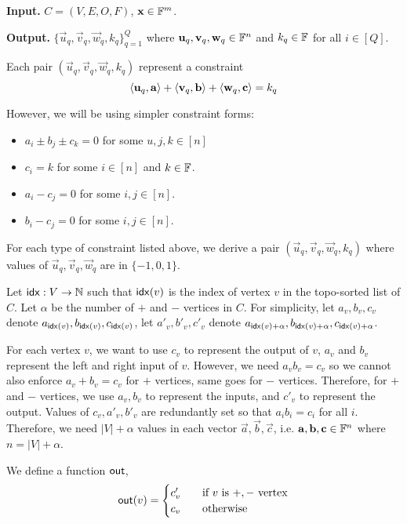 \textbf{Input.} $C = (V, E, O, F)$, $\mathbf{x} \in \mathbb{F}^m$.

\textbf{Output.} $\{ \Vec{u}_q, \Vec{v}_q, \Vec{w}_q, k_q \}_{q=1}^{Q}$ where $\mathbf{u}_q, \mathbf{v}_q, \mathbf{w}_q \in \mathbb{F}^n$ and $k_q \in \mathbb{F}$ for all $i \in [Q]$.

Each pair $(\Vec{u}_q, \Vec{v}_q, \Vec{w}_q, k_q)$ represent a constraint
$$\langle \mathbf{u}_q, \mathbf{a} \rangle + \langle \mathbf{v}_q, \mathbf{b} \rangle + \langle \mathbf{w}_q, \mathbf{c} \rangle = k_q$$

However, we will be using simpler constraint forms:
\begin{itemize}
    \item $a_i \pm b_j \pm c_k = 0$ for some $u, j, k \in [n]$
    \item $c_i = k$ for some $i \in [n]$ and $k \in \mathbb{F}$.
    \item $a_i - c_j = 0$ for some $i, j \in [n]$.
    \item $b_i - c_j = 0$ for some $i, j \in [n]$.
\end{itemize}

For each type of constraint listed above, we derive a pair $(\Vec{u}_q, \Vec{v}_q, \Vec{w}_q, k_q)$ where values of $\Vec{u}_q, \Vec{v}_q, \Vec{w}_q$ are in $\{-1, 0, 1\}$.

Let $\mathsf{idx}: V \to \mathbb{N}$ such that $\mathsf{idx}(v)$ is the index of vertex $v$ in the topo-sorted list of $C$. Let $\alpha$ be the number of $+$ and $-$ vertices in $C$. For simplicity, let $a_v, b_v, c_v$ denote $a_{\mathsf{idx}(v)}, b_{\mathsf{idx}(v)}, c_{\mathsf{idx}(v)}$, let $a'_v, b'_v, c'_v$ denote $a_{\mathsf{idx}(v) + \alpha}, b_{\mathsf{idx}(v) + \alpha}, c_{\mathsf{idx}(v) + \alpha}$.

For each vertex $v$, we want to use $c_v$ to represent the output of $v$, $a_v$ and $b_v$ represent the left and right input of $v$. However, we need $a_v b_v = c_v$ so we cannot also enforce $a_v + b_v = c_v$ for $+$ vertices, same goes for $-$ vertices. Therefore, for $+$ and $-$ vertices, we use $a_v, b_v$ to represent the inputs, and $c'_v$ to represent the output. Values of $c_v, a'_v, b'_v$ are redundantly set so that $a_i b_i = c_i$ for all $i$. Therefore, we need $|V| + \alpha$ values in each vector $\Vec{a}, \Vec{b}, \Vec{c}$, i.e. $\mathbf{a}, \mathbf{b}, \mathbf{c} \in \mathbb{F}^n$ where $n = |V| + \alpha$.

We define a function $\mathsf{out}$,
\[
\mathsf{out}(v) =
\begin{cases}
    c'_v & \quad \text{if $v$ is $+, -$ vertex} \\
    c_v & \quad \text{otherwise}
\end{cases}
\]

